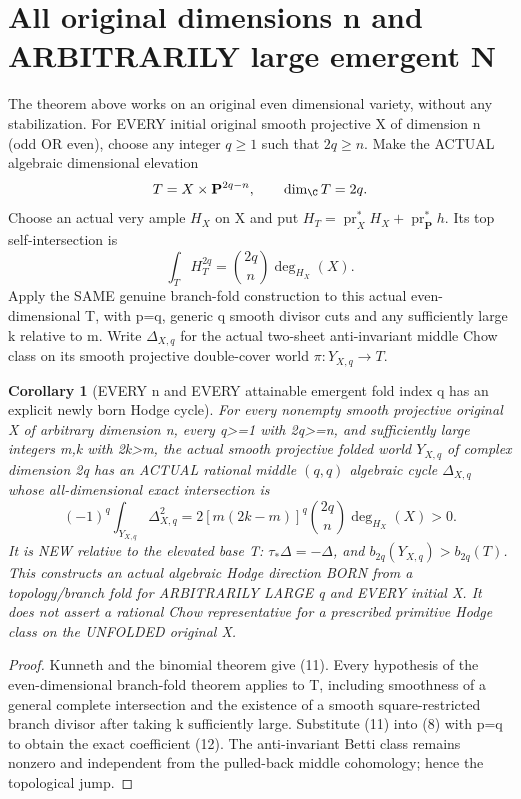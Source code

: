 \documentclass[11pt]{article}
\newcommand{\pr}{\operatorname{pr}}
\newtheorem{corollary}[theorem]{Corollary}
\begin{document}
\section{All original dimensions n and ARBITRARILY large emergent N}
The theorem above works on an original even
dimensional variety, without any stabilization.
For EVERY initial original smooth projective
X of dimension n (odd OR even), choose any
integer \(q\ge1\) such that \(2q\ge n\).
Make the ACTUAL algebraic dimensional elevation
\[
 T=X\times\mathbf P^{2q-n},\qquad
 \dim_\C T=2q.
\]
Choose an actual very ample \(H_X\) on X and
put \(H_T=\pr_X^*H_X+
          \pr_{\mathbf P}^*h\).
Its top self-intersection is
\[
 \boxed{
 \int_T H_T^{2q}
   =\binom{2q}{n}\deg_{H_X}(X).
 }                                                        \tag{11}
\]
Apply the SAME genuine branch-fold construction
to this actual even-dimensional T, with p=q,
generic q smooth divisor cuts and any sufficiently
large k relative to m.
Write \(\Delta_{X,q}\) for the actual two-sheet
anti-invariant middle Chow class on its smooth
projective double-cover world
\(\pi:Y_{X,q}\to T\).

\begin{corollary}[EVERY n and EVERY attainable emergent fold index q has an explicit newly born Hodge cycle]
For every nonempty smooth projective original X
of arbitrary dimension n, every q>=1 with 2q>=n,
and sufficiently large integers m,k with 2k>m,
the actual smooth projective folded world
\(Y_{X,q}\) of complex dimension 2q has an
ACTUAL rational middle \((q,q)\) algebraic
cycle \(\Delta_{X,q}\) whose
all-dimensional exact intersection is
\[
 \boxed{
 (-1)^q\int_{Y_{X,q}}\Delta_{X,q}^2
  =2[m(2k-m)]^q
       \binom{2q}{n}\deg_{H_X}(X)
  >0.
 }                                                        \tag{12}
\]
It is NEW relative to the elevated base T:
\(\tau_*\Delta=-\Delta\), and
\(b_{2q}(Y_{X,q})>b_{2q}(T)\).
This constructs an actual algebraic Hodge
direction BORN from a topology/branch fold for
ARBITRARILY LARGE q and EVERY initial X.
It does not assert a rational Chow representative
for a prescribed primitive Hodge class on the
UNFOLDED original X.
\end{corollary}
\begin{proof}
Kunneth and the binomial theorem give (11).
Every hypothesis of the even-dimensional
branch-fold theorem applies to T,
including smoothness of a general complete
intersection and the existence of a smooth
square-restricted branch divisor after
taking k sufficiently large.
Substitute (11) into (8) with p=q to obtain
the exact coefficient (12).
The anti-invariant Betti class remains nonzero
and independent from the pulled-back middle
cohomology; hence the topological jump.
\end{proof}
\end{document}
